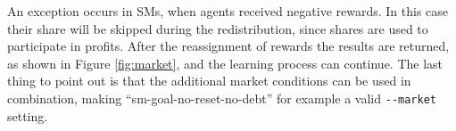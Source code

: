 An exception occurs in SMs, when agents received negative rewards. In this case their share will be skipped during the redistribution, since shares are used to participate in profits. After the reassignment of rewards the results are returned, as shown in Figure \ref{fig:market}, and the learning process can continue. The last thing to point out is that the additional market conditions can be used in combination, making ``sm-goal-no-reset-no-debt'' for example a valid \verb|--market| setting.

